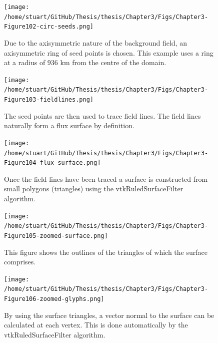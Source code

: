 \documentclass[a4paper,12pt,fourier,authoryear,custommargin]{Classes/PhDThesisPSnPDF}
\begin{document}
\begin{figure}[H]
    \centering
    \texttt{[image: /home/stuart/GitHub/Thesis/thesis/Chapter3/Figs/Chapter3-Figure102-circ-seeds.png]}
    \caption{Due to the axisymmetric nature of the background field, an axisymmetric ring of seed points is chosen. This example uses a ring at a radius of $936$ km from the centre of the domain.}
    \label{fig:circ-seeds}
\end{figure}

\begin{figure}[H]
    \centering
    \texttt{[image: /home/stuart/GitHub/Thesis/thesis/Chapter3/Figs/Chapter3-Figure103-fieldlines.png]}
    \caption{The seed points are then used to trace field lines. The field lines naturally form a flux surface by definition.}
    \label{fig:fieldlines}
\end{figure}

\begin{figure}[H]
    \centering
    \texttt{[image: /home/stuart/GitHub/Thesis/thesis/Chapter3/Figs/Chapter3-Figure104-flux-surface.png]}
    \caption{Once the field lines have been traced a surface is constructed from small polygons (triangles) using the vtkRuledSurfaceFilter algorithm.}
    \label{fig:flux-surface}
\end{figure}

\begin{figure}[H]
    \centering
    \texttt{[image: /home/stuart/GitHub/Thesis/thesis/Chapter3/Figs/Chapter3-Figure105-zoomed-surface.png]}
    \caption{This figure shows the outlines of the triangles of which the surface comprises.}
    \label{fig:zoomed-surface}
\end{figure}

\begin{figure}[H]
    \centering
    \texttt{[image: /home/stuart/GitHub/Thesis/thesis/Chapter3/Figs/Chapter3-Figure106-zoomed-glyphs.png]}
    \caption{By using the surface triangles, a vector normal to the surface can be calculated at each vertex. This is done automatically by the vtkRuledSurfaceFilter algorithm.}
    \label{fig:zoomed-glyphs}
\end{figure}

\clearpage{}%
%

%
\clearpage{}%
\end{document}
